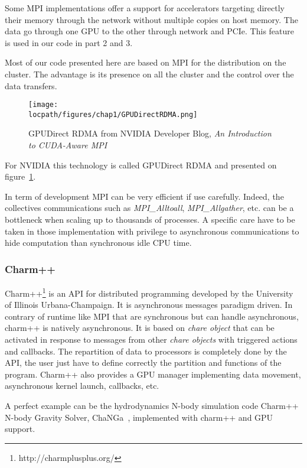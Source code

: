 Some MPI implementations offer a support for accelerators targeting directly their memory through the network without multiple copies on host memory. 
The data go through one GPU to the other through network and PCIe.
This feature is used in our code in part 2 and 3.

Most of our code presented here are based on MPI for the distribution on the cluster. 
The advantage is its presence on all the cluster and the control over the data transfers. 

\begin{figure}
\begin{center}
\texttt{[image: \\locpath/figures/chap1/GPUDirectRDMA.png]}
\caption{GPUDirect RDMA from NVIDIA Developer Blog, \textit{An Introduction to CUDA-Aware MPI
}}
\label{fig:1_HPC:gpudirect_rdma}
\end{center}
\end{figure}

For NVIDIA this technology is called GPUDirect RDMA and presented on figure~\ref{fig:1_HPC:gpudirect_rdma}. 

In term of development MPI can be very efficient if use carefully. 
Indeed, the collectives communications such as \textit{MPI\_Alltoall}, \textit{MPI\_Allgather}, etc. can be a bottleneck when scaling up to thousands of processes. 
A specific care have to be taken in those implementation with privilege to asynchronous communications to hide computation than synchronous idle CPU time. 

\subsubsection{Charm++}
Charm++\footnote{http://charmplusplus.org/} is an API for distributed programming developed by the University of Illinois Urbana-Champaign.
It is asynchronous messages paradigm driven.
In contrary of runtime like MPI that are synchronous but can handle asynchronous, charm++ is natively asynchronous. 
It is based on \textit{chare object} that can be activated in response to messages from other \textit{chare objects} with triggered actions and callbacks. 
The repartition of data to processors is completely done by the API, the user just have to define correctly the partition and functions of the program. 
Charm++ also provides a GPU manager implementing data movement, asynchronous kernel launch, callbacks, etc.

A perfect example can be the hydrodynamics N-body simulation code Charm++ N-body Gravity Solver, ChaNGa~\cite{jetley2010scaling}, implemented with charm++ and GPU support. 

